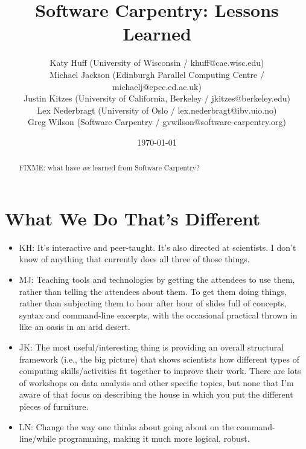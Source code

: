 \documentclass{article}
\begin{document}
\title{Software Carpentry: Lessons Learned}
\date{\today}

\author{
  Katy Huff (University of  Wisconsin / khuff@cae.wisc.edu)\\
  Michael Jackson (Edinburgh Parallel Computing Centre / michaelj@epcc.ed.ac.uk)\\
  Justin Kitzes (University of California, Berkeley / jkitzes@berkeley.edu)\\
  Lex Nederbragt (University of Oslo / lex.nederbragt@ibv.uio.no)\\
  Greg Wilson (Software Carpentry / gvwilson@software-carpentry.org)
}

\maketitle

\begin{abstract}
FIXME: what have \emph{we} learned from Software Carpentry?
\end{abstract}

\section{What We Do That's Different}

\begin{itemize}

  \item KH: It's interactive and peer-taught. It's also directed at scientists. I don't know of anything that currently does all three of those things.

  \item MJ: Teaching tools and technologies by getting the attendees to use them, rather than telling the attendees about them. To get them doing things, rather than subjecting them to hour after hour of slides full of concepts, syntax and command-line excerpts, with the occasional practical thrown in like an oasis in an arid desert.

  \item JK: The most useful/interesting thing is providing an overall structural framework (i.e., the big picture) that shows scientists how different types of computing skills/activities fit together to improve their work. There are lots of workshops on data analysis and other specific topics, but none that I'm aware of that focus on describing the house in which you put the different pieces of furniture.

  \item LN: Change the way one thinks about going about on the command-line/while programming, making it much more logical, robust.

\end{itemize}
\end{document}
